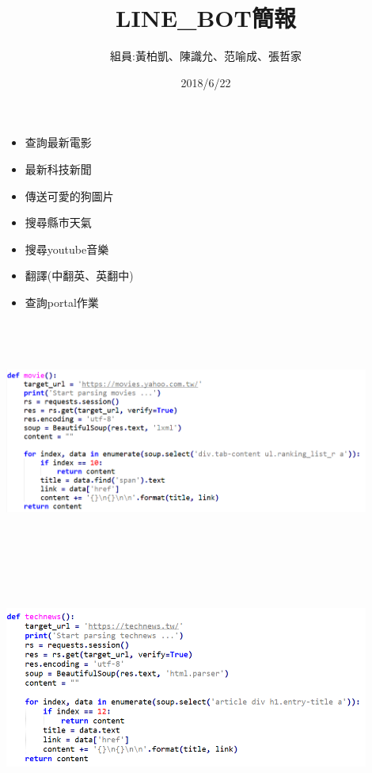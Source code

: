 \documentclass{beamer}
\date{}
\begin{document}
\begin{CJK}{UTF8}{bkai}
\begin{frame}%
\title{\LARGE LINE_BOT簡報}
\author{組員:黃柏凱、陳識允、范喻成、張哲家}
\date{2018/6/22}
\titlepage
\end{frame}
%
\begin{frame}%
\frametitle{}
\begin{itemize}
\item 查詢最新電影
\pause
\item 最新科技新聞
\pause
\item 傳送可愛的狗圖片
\pause
\item 搜尋縣市天氣
\pause
\item 搜尋youtube音樂
\pause
\item 翻譯(中翻英、英翻中)
\pause
\item 查詢portal作業
\end{itemize}
\titlepage
\end{frame}

\begin{frame}%
\frametitle{}
\includegraphics[width=12cm,height=7.5cm]{movie.png} 
\titlepage
\end{frame}

\begin{frame}%
\frametitle{}
\includegraphics[width=12cm,height=7.5cm]{technews.png} 
\titlepage
\end{frame}


\end{CJK}
\end{document}
